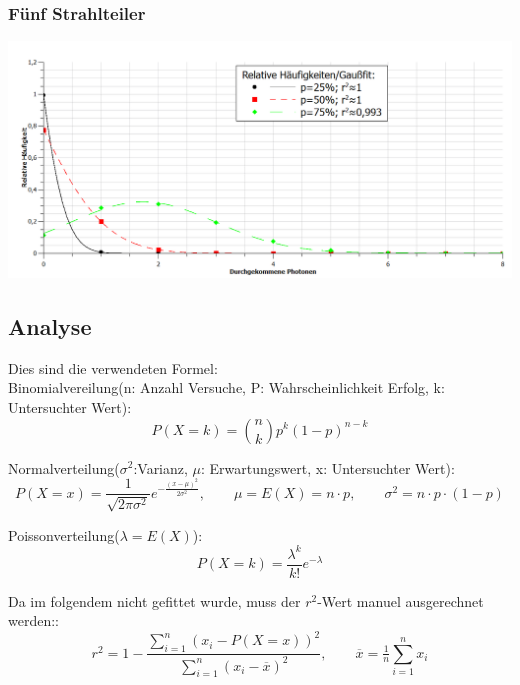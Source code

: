 \subsubsection{Fünf Strahlteiler}

\begin{center}
	\includegraphics{IMAGE/5ST}
\end{center}
\clearpage
\subsection{Analyse}
 
 Dies sind die verwendeten Formel:\\
 
 Binomialvereilung(n: Anzahl Versuche, P: Wahrscheinlichkeit Erfolg, k: Untersuchter Wert):\\
\begin{equation*}
 	P(X= k) = \binom{n}{k}p^k(1-p)^{n-k}
\end{equation*}

Normalverteilung($\sigma^2$:Varianz, $\mu$: Erwartungswert, x: Untersuchter Wert):\\
\begin{equation*}
	P(X= x) = \frac{1}{\sqrt{2\pi\sigma^2}}e^{-\frac{(x-\mu)^2}{2\sigma^2}},\qquad \mu = E(X) = n\cdot p, \qquad \sigma^2 = n\cdot p \cdot(1-p)
\end{equation*}

Poissonverteilung($\lambda=E(X)$):\\
\begin{equation*}
	P(X=k)= \frac{\lambda^k}{k!}e^{-\lambda}
\end{equation*}

Da im folgendem nicht gefittet wurde, muss der $r^2$-Wert manuel ausgerechnet werden::\\
\begin{equation*}
	r^2 = 1- \frac{\sum_{i=1}^n(x_i-P(X=x))^2}{\sum_{i=1}^n(x_i-\overline{x})^2}, \qquad \overline{x}=\tfrac{1}{n}\sum_{i=1}^n x_i
\end{equation*}

